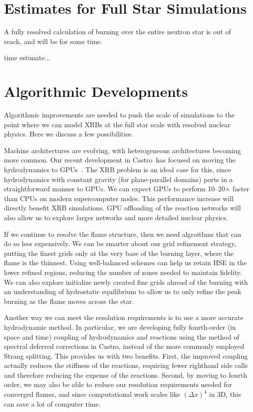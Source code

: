 \documentclass[a4paper]{jpconf}
\newcommand{\castro}{{\sffamily Castro}}
\newcommand{\MarginPar}[1]{\marginpar{\vskip-\baselineskip\raggedright\tiny\sffamily\hrule\smallskip{\color{red}#1}\par\smallskip\hrule}}
\begin{document}
\section{Estimates for Full Star Simulations}

A fully resolved calculation of burning over the entire neutron star
is out of reach, and will be for some time.

time estimate...

\MarginPar{Alice and Mike will work on this}


\section{Algorithmic Developments}

Algorithmic improvements are needed to push the scale of simulations
to the point where we can model XRBs at the full star scale with
resolved nuclear physics.  Here we discuss a few possibilities.

Machine architectures are evolving, with heterogeneous architectures
becoming more common.  Our recent development in \castro\ has focused
on moving the hydrodynamics to GPUs~\cite{astronum:2017}.  The XRB
problem is an ideal case for this, since hydrodynamics with constant
gravity (for plane-parallel domains) ports in a straightforward manner
to GPUs.  We can expect GPUs to perform 10--20$\times$ faster than
CPUs on modern supercomputer nodes.  This performance increase will
directly benefit XRB simulations.  GPU offloading of the reaction networks
will also allow us to explore larger networks and more detailed nuclear
physics.

If we continue to resolve the flame structure, then we need algroithms
that can do so less expensively.  We can be smarter about our grid
refinement strategy, putting the finest grids only at the very base of
the burning layer, where the flame is the thinnest.  Using
well-balanced schemes can help us retain HSE in the lower refined
regions, reducing the number of zones needed to maintain fidelity.  We
can also explore initialize newly created fine grids ahread of the burning
with an understanding of hydrostatic equilibrium to allow us to only refine
the peak burning as the flame moves across the star.

Another way we can meet the resolution requirements is to use a more
accurate hydrodynamic method.  In particular, we are developing fully
fourth-order (in space and time) coupling of hydrodynamics and
reactions using the method of spectral deferred corrections in
\castro, instead of the more commonly employed Strang splitting.  This
provides us with two benefits.  First, the improved coupling actually
reduces the stiffness of the reactions, requiring fewer righthand side
calls and therefore reducing the expense of the
reactions. \MarginPar{need some refs here} Second, by moving to fourth
order, we may also be able to reduce our resolution requirements
needed for converged flames, and since computational work scales like
$(\Delta x)^4$ in 3D, this can save a lot of computer time.
\end{document}
